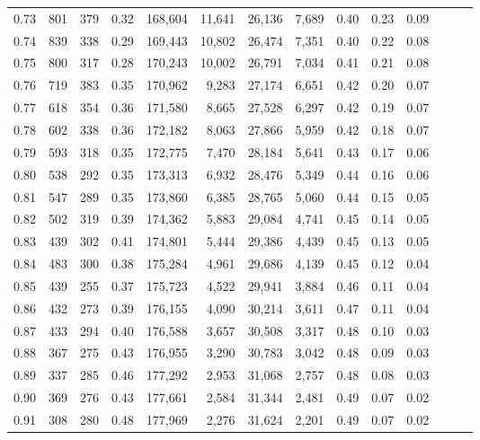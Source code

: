 \begin{tabular}{rrrrrrrrrrrrrr}
0.73 &    801 &  379 &  0.32 &  168,604 &   11,641 &  26,136 &   7,689 &  0.40 &  0.23 &      0.09 \\
0.74 &    839 &  338 &  0.29 &  169,443 &   10,802 &  26,474 &   7,351 &  0.40 &  0.22 &      0.08 \\
0.75 &    800 &  317 &  0.28 &  170,243 &   10,002 &  26,791 &   7,034 &  0.41 &  0.21 &      0.08 \\
0.76 &    719 &  383 &  0.35 &  170,962 &    9,283 &  27,174 &   6,651 &  0.42 &  0.20 &      0.07 \\
0.77 &    618 &  354 &  0.36 &  171,580 &    8,665 &  27,528 &   6,297 &  0.42 &  0.19 &      0.07 \\
0.78 &    602 &  338 &  0.36 &  172,182 &    8,063 &  27,866 &   5,959 &  0.42 &  0.18 &      0.07 \\
0.79 &    593 &  318 &  0.35 &  172,775 &    7,470 &  28,184 &   5,641 &  0.43 &  0.17 &      0.06 \\
0.80 &    538 &  292 &  0.35 &  173,313 &    6,932 &  28,476 &   5,349 &  0.44 &  0.16 &      0.06 \\
0.81 &    547 &  289 &  0.35 &  173,860 &    6,385 &  28,765 &   5,060 &  0.44 &  0.15 &      0.05 \\
0.82 &    502 &  319 &  0.39 &  174,362 &    5,883 &  29,084 &   4,741 &  0.45 &  0.14 &      0.05 \\
0.83 &    439 &  302 &  0.41 &  174,801 &    5,444 &  29,386 &   4,439 &  0.45 &  0.13 &      0.05 \\
0.84 &    483 &  300 &  0.38 &  175,284 &    4,961 &  29,686 &   4,139 &  0.45 &  0.12 &      0.04 \\
0.85 &    439 &  255 &  0.37 &  175,723 &    4,522 &  29,941 &   3,884 &  0.46 &  0.11 &      0.04 \\
0.86 &    432 &  273 &  0.39 &  176,155 &    4,090 &  30,214 &   3,611 &  0.47 &  0.11 &      0.04 \\
0.87 &    433 &  294 &  0.40 &  176,588 &    3,657 &  30,508 &   3,317 &  0.48 &  0.10 &      0.03 \\
0.88 &    367 &  275 &  0.43 &  176,955 &    3,290 &  30,783 &   3,042 &  0.48 &  0.09 &      0.03 \\
0.89 &    337 &  285 &  0.46 &  177,292 &    2,953 &  31,068 &   2,757 &  0.48 &  0.08 &      0.03 \\
0.90 &    369 &  276 &  0.43 &  177,661 &    2,584 &  31,344 &   2,481 &  0.49 &  0.07 &      0.02 \\
0.91 &    308 &  280 &  0.48 &  177,969 &    2,276 &  31,624 &   2,201 &  0.49 &  0.07 &      0.02 \\

\end{tabular}

